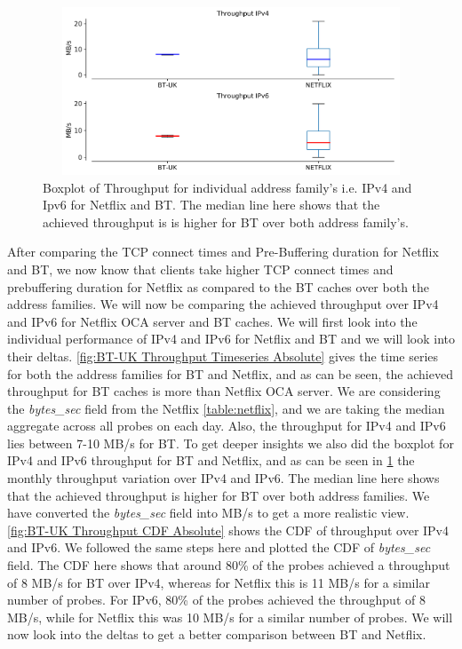 \begin{figure}[!ht]
	\centering
	\includegraphics[keepaspectratio, height=5cm, width=15cm]{figures/cache/btuk/netflix-throughput-boxplot-asn-2856-separate.pdf}
	\caption[BT-UK Throughput Boxplot Absolute]{Boxplot of Throughput for individual address family's i.e. IPv4 and Ipv6 for Netflix and BT. The median line here shows that the achieved throughput is
	is higher for BT over both address family's.}
	\label{fig:BT-UK Throughput Boxplot Absolute}
\end{figure}

After comparing the TCP connect times and Pre-Buffering duration for Netflix and BT, we now know that clients take higher TCP connect times and prebuffering duration
for Netflix as compared to the BT caches over both the address families. We will now be comparing the achieved throughput over IPv4 and IPv6 for Netflix OCA server and BT caches.
We will first look into the individual performance of IPv4 and IPv6 for Netflix and BT and we will look into their deltas. \cref{fig:BT-UK Throughput Timeseries Absolute} gives the time series for
both the address families for BT and Netflix, and as can be seen, the achieved throughput for BT caches is more than Netflix OCA server.
We are considering the \textit{bytes\_sec} field from the Netflix \cref{table:netflix}, and we are taking the median aggregate across
all probes on each day. Also, the throughput for IPv4 and IPv6 lies between 7-10 MB/s for BT. To get deeper insights
we also did the boxplot for IPv4 and IPv6 throughput for BT and Netflix, and as can be seen in \cref{fig:BT-UK Throughput Boxplot Absolute} the monthly
throughput variation over IPv4 and IPv6. The median line here shows that the achieved throughput is higher for BT over both address families. We have converted the \textit{bytes\_sec} field into MB/s to get a more realistic view. \cref{fig:BT-UK Throughput CDF Absolute} shows the CDF of
throughput over IPv4 and IPv6. We followed the same steps here and plotted the CDF of \textit{bytes\_sec} field. The CDF here shows that around 80\% of the probes achieved a throughput of 8 MB/s for BT over IPv4, whereas for Netflix this is 11 MB/s
for a similar number of probes. For IPv6, 80\% of the probes achieved the throughput of 8 MB/s, while for Netflix this was 10 MB/s for a similar number of probes. 
We will now look into the deltas to get a better comparison between BT and Netflix. 

